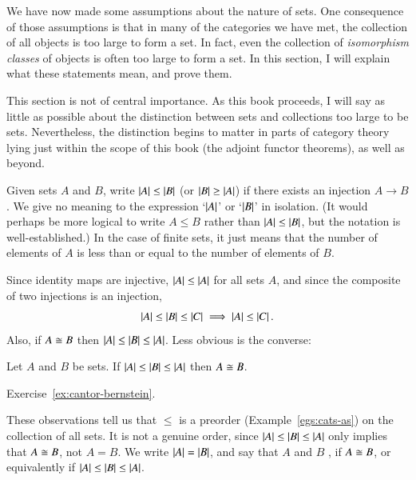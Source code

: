 We have now made some assumptions about the nature of sets.  One
consequence of those assumptions is that in many of the categories we have
met, the collection of all objects is too large to form a set.  In fact,
even the collection of \emph{isomorphism classes} of objects is often too
large to form a set.  In this section, I will explain what these statements
mean, and prove them.

This section is not of central importance.  As this book proceeds, I will
say as little as possible about the distinction between sets and
collections too large to be sets.  Nevertheless, the distinction begins to
matter in parts of category theory lying just within the scope of this book
(the adjoint functor theorems), as well as beyond.

Given sets $A$ and $B$, write $\left|A\right| \leq \left|B\right|$%
%
%
%
(or $\left|B\right| \geq \left|A\right|$) if there exists an injection $A \to B$.  We
give no meaning to the expression `$\left|A\right|$' or `$\left|B\right|$' in isolation.
(It would perhaps be more logical to write $A \leq B$ rather than $\left|A\right|
\leq \left|B\right|$, but the notation is well-established.)  In the case of
finite sets, it just means that the number of elements of $A$ is less than
or equal to the number of elements of $B$.

Since identity maps are injective, $\left|A\right| \leq \left|A\right|$ for all sets
$A$, and since the composite of two injections is an injection,
\[
\left|A\right| \leq \left|B\right| \leq \left|C\right| \implies \left|A\right| \leq \left|C\right|.
\]
Also, if $A \cong B$ then $\left|A\right| \leq \left|B\right| \leq \left|A\right|$.  Less obvious
is the converse:

\begin{thm}
\label{thm:cantor-bernstein}
%
%
Let $A$ and $B$ be sets.  If $\left|A\right| \leq \left|B\right| \leq \left|A\right|$ then $A
\cong B$.
\end{thm}

\begin{pf}
Exercise~\ref{ex:cantor-bernstein}.
\end{pf}

These observations tell us that $\leq$ is a preorder
(Example~\ref{egs:cats-as}) on the collection of
all sets.  It is not a genuine order, since $\left|A\right| \leq \left|B\right| \leq
\left|A\right|$ only implies that $A \cong B$, not $A = B$.  We write $\left|A\right| =
\left|B\right|$,%
%
%
and say that $A$ and $B$ ,%
%
%
if $A \cong B$, or equivalently if $\left|A\right| \leq \left|B\right| \leq \left|A\right|$.

